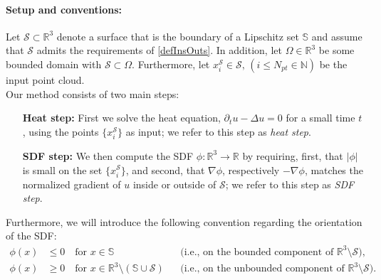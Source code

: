 \documentclass[12pt,openany]{book}
\newcommand{\R}{\mathbb{R}}
\def\S{\mathcal{S}}
\theoremstyle{plainnormal}
\theoremstyle{remark}
\begin{document}
\paragraph{Setup and conventions:}
Let \(\mathcal{S} \subset \mathbb{R}^3\) denote a surface that is the boundary of a Lipschitz set \(\mathbb{S} \) and assume that $\S$ admits the requirements of \cref{defInsOuts}. In addition, let $\Omega \in \R^3$ be some bounded domain with $\S \subset \Omega$.
Furthermore, let $x^\S_i\in \mathcal{S}, \, (i \leq N_{pt}\in \mathbb N)$ be the input point cloud.\\
Our method consists of two main steps:
\begin{enumerate}[align=left]
\item[\textbf{Heat step:}]First we solve the heat equation, $\partial_t u - \Delta u = 0$ for a small time $t$, using the points $\{x^\S_i\}$ as input; we refer to this step as \emph{heat step}.
\item[\textbf{SDF step:}]We then compute the SDF $\phi: \mathbb{R}^3\rightarrow\R$ by requiring, first, that $|\phi|$ is small on the set $\{x_i^\mathcal{S}\}$, and second, that $\nabla \phi$, respectively $-\nabla \phi$, matches the normalized gradient of $u$ inside or outside of $\mathcal{S}$; we refer to this step as \emph{SDF step}.
\end{enumerate}
Furthermore, we will introduce the following convention regarding the orientation of the SDF:
\begin{align*}
\phi(x) &\leq 0 \quad \text{for } x \in \mathbb S \, \,\, &&\text{(i.e., on the bounded component of }\R^3\setminus\mathcal{S}), \\ \phi(x) &\geq 0 \quad \text{for } x \in \mathbb{R}^3 \setminus (\mathbb{S} \cup \mathcal S)  &&\text{(i.e., on the unbounded component of }\R^3\setminus\mathcal{S}).   
\end{align*}
\end{document}

